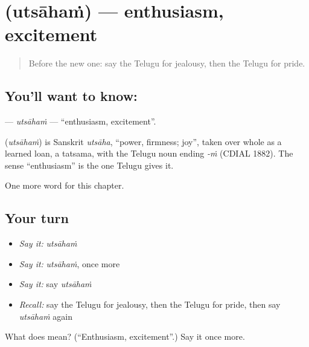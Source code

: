 \section[\texorpdfstring{\te{ఉత్సాహం} (utsāhaṁ)}{ఉత్సాహం (utsāhaṁ)}]{ (utsāhaṁ) — enthusiasm, excitement}

\label{lesson:TE-C168-utsaham}



\begin{quote}
Before the new one: say the Telugu for jealousy, then the Telugu for pride.
\end{quote}

\subsection*{You'll want to know: }
\textbf{} — \emph{utsāhaṁ} — \textquotedblleft{}enthusiasm, excitement\textquotedblright{}.

\begin{cousinweb}
\textbf{} (\emph{utsāhaṁ}) is Sanskrit \emph{utsāha}, \textquotedblleft{}power, firmness; joy\textquotedblright{}, taken over whole as a learned loan, a tatsama, with the Telugu noun ending \emph{-ṁ} (CDIAL 1882). The sense \textquotedblleft{}enthusiasm\textquotedblright{} is the one Telugu gives it.
\end{cousinweb}

\begin{grammarlens}[title={What you've built}]
One more word for this chapter.
\end{grammarlens}

\subsection*{Your turn}
\begin{itemize}
\raggedright
  \item \emph{Say it:} \emph{utsāhaṁ}
  \item \emph{Say it:} \emph{utsāhaṁ}, once more
  \item \emph{Say it:} say \emph{utsāhaṁ}
  \item \emph{Recall:} say the Telugu for jealousy, then the Telugu for pride, then say \emph{utsāhaṁ} again
\end{itemize}

\begin{tcolorbox}[breakable,colback=teal!4,colframe=teal!35!black,title={Before you move on}]
What does  mean? (\textquotedblleft{}Enthusiasm, excitement\textquotedblright{}.) Say it once more.
\end{tcolorbox}
